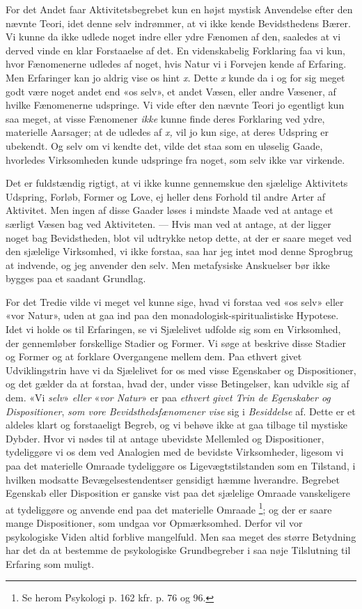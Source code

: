 \documentclass[12pt,a4paper,openany]{book}
\newcommand{\opage}[1]{\marginnote{\footnotesize\textit{[#1]}}}
\begin{document}
For det Andet faar Aktivitetsbegrebet kun en højst mystisk Anvendelse efter den
nævnte Teori, idet denne selv indrømmer, at vi ikke kende Bevidsthedens Bærer.
Vi kunne da ikke udlede noget indre eller ydre Fænomen af den, saaledes at vi
derved vinde en klar Forstaaelse af det. En videnskabelig Forklaring faa vi
kun, hvor Fænomenerne udledes af noget, hvis Natur vi i Forvejen kende af
Erfaring. Men Erfaringer kan jo aldrig vise os hint \textit{x.} Dette
\textit{x} kunde da i og for sig meget godt være noget andet end «os selv», et
andet Væsen, eller andre Væsener, af hvilke Fænomenerne udspringe. Vi vide
efter den nævnte Teori jo egentligt kun saa meget, at visse Fænomener
\emph{ikke} kunne finde deres Forklaring ved ydre, materielle Aarsager; at de
udledes af \textit{x,} vil jo kun sige, at deres
\setcounter{footnote}{0}%
\opage{80}Udspring er ubekendt. Og selv om vi kendte det, vilde det staa som en
uløselig Gaade, hvorledes Virksomheden kunde udspringe fra noget, som selv ikke
var virkende.

Det er fuldstændig rigtigt, at vi ikke kunne gennemskue den sjælelige
Aktivitets Udspring, Forløb, Former og Love, ej heller dens Forhold til andre
Arter af Aktivitet. Men ingen af disse Gaader løses i mindste Maade ved at
antage et særligt Væsen bag ved Aktiviteten. --- Hvis man ved at antage, at der
ligger noget bag Bevidstheden, blot vil udtrykke netop dette, at der er saare
meget ved den sjælelige Virksomhed, vi ikke forstaa, saa har jeg intet mod
denne Sprogbrug at indvende, og jeg anvender den selv. Men metafysiske
Anskuelser bør ikke bygges paa et saadant Grundlag.

For det Tredie vilde vi meget vel kunne sige, hvad vi forstaa ved «os selv»
eller «vor Natur», uden at gaa ind paa den monadologisk-spiritualistiske
Hypotese. Idet vi holde os til Erfaringen, se vi Sjælelivet udfolde sig som en
Virksomhed, der gennemløber forskellige Stadier og Former. Vi søge at beskrive
disse Stadier og Former og at forklare Overgangene mellem dem. Paa ethvert
givet Udviklingstrin have vi da Sjælelivet for os med visse Egenskaber og
Dispositioner, og det gælder da at forstaa, hvad der, under visse Betingelser,
kan udvikle sig af dem. «Vi \emph{selv}» \emph{eller} «\emph{vor Natur}» er paa
\emph{ethvert givet Trin de Egenskaber og Dispositioner}, \emph{som vore
Bevidsthedsfænomener vise} sig i \emph{Besiddelse} af. Dette er et aldeles
klart og forstaaeligt Begreb, og vi behøve ikke at gaa tilbage til mystiske
Dybder. Hvor vi nødes til at antage ubevidste Mellemled og Dispositioner,
tydeliggøre vi os dem ved Analogien med de bevidste Virksomheder, ligesom vi
paa det materielle Omraade tydeliggøre os Ligevægtstilstanden som en Tilstand,
i hvilken modsatte Bevægelsestendentser gensidigt hæmme hverandre. Begrebet
Egenskab eller Disposition er ganske vist paa det sjælelige Omraade
vanskeligere at tydeliggøre og anvende end paa det materielle Omraade%
\footnote[1]{Se herom Psykologi p. 162 kfr. p. 76 og 96.}; og der er saare
mange Dispositioner, som undgaa vor Opmærksomhed. Derfor vil vor psykologiske
Viden altid forblive mangelfuld. Men saa meget des større Betydning har det da
at bestemme de psykologiske Grundbegreber i saa nøje Tilslutning til Erfaring
som muligt.
\end{document}
